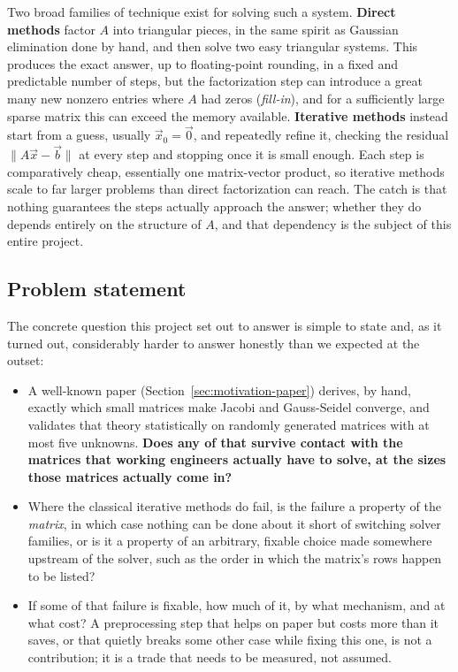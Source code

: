 \documentclass[11pt,a4paper]{article}
\begin{document}
Two broad families of technique exist for solving such a system. \textbf{Direct methods}
factor $A$ into triangular pieces, in the same spirit as Gaussian elimination done by
hand, and then solve two easy triangular systems. This produces the exact answer, up to
floating-point rounding, in a fixed and predictable number of steps, but the factorization
step can introduce a great many new nonzero entries where $A$ had zeros (\emph{fill-in}),
and for a sufficiently large sparse matrix this can exceed the memory available.
\textbf{Iterative methods} instead start from a guess, usually $\vec{x}_0 = \vec{0}$, and
repeatedly refine it, checking the residual $\|A\vec{x}-\vec{b}\|$ at every step and
stopping once it is small enough. Each step is comparatively cheap, essentially one
matrix-vector product, so iterative methods scale to far larger problems than direct
factorization can reach. The catch is that nothing guarantees the steps actually approach
the answer; whether they do depends entirely on the structure of $A$, and that dependency
is the subject of this entire project.

\subsection{Problem statement}
\label{sec:intro-statement}

The concrete question this project set out to answer is simple to state and, as it
turned out, considerably harder to answer honestly than we expected at the outset:

\begin{itemize}[leftmargin=1.4cm]
  \item A well-known paper (Section~\ref{sec:motivation-paper}) derives, by hand, exactly
  which small matrices make Jacobi and Gauss-Seidel converge, and validates that theory
  statistically on randomly generated matrices with at most five unknowns. \textbf{Does
  any of that survive contact with the matrices that working engineers actually have to
  solve, at the sizes those matrices actually come in?}
  \item Where the classical iterative methods do fail, is the failure a property of the
  \emph{matrix}, in which case nothing can be done about it short of switching solver
  families, or is it a property of an arbitrary, fixable choice made somewhere upstream of
  the solver, such as the order in which the matrix's rows happen to be listed?
  \item If some of that failure is fixable, how much of it, by what mechanism, and at what
  cost? A preprocessing step that helps on paper but costs more than it saves, or that
  quietly breaks some other case while fixing this one, is not a contribution; it is a
  trade that needs to be measured, not assumed.
\end{itemize}
\end{document}
